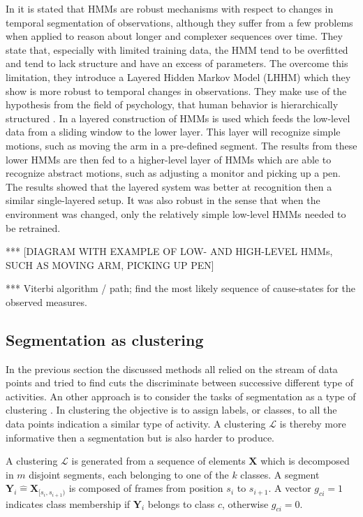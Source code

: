 In \cite{oliver2002layered} it is stated that HMMs are robust mechanisms with respect to changes in temporal segmentation of observations, although they suffer from a few problems when applied to reason about longer and complexer sequences over time.
They state that, especially with limited training data, the HMM tend to be overfitted and tend to lack structure and have an excess of parameters.
The overcome this limitation, they introduce a Layered Hidden Markov Model (LHHM) which they show is more robust to temporal changes in observations.
They make use of the hypothesis from the field of psychology, that human behavior is hierarchically structured \cite{zacks2001event}.
In \cite{perdikis2008recognition} a layered construction of HMMs is used which feeds the low-level data from a sliding window to the lower layer.
This layer will recognize simple motions, such as moving the arm in a pre-defined segment.
The results from these lower HMMs are then fed to a higher-level layer of HMMs which are able to recognize abstract motions, such as adjusting a monitor and picking up a pen.
The results showed that the layered system was better at recognition then a similar single-layered setup.
It was also robust in the sense that when the environment was changed, only the relatively simple low-level HMMs needed to be retrained.

*** [DIAGRAM WITH EXAMPLE OF LOW- AND HIGH-LEVEL HMMs, SUCH AS MOVING ARM, PICKING UP PEN]


*** Viterbi algorithm / path; find the most likely sequence of cause-states for the observed measures.





\subsection{Segmentation as clustering}
In the previous section the discussed methods all relied on the stream of data points and tried to find cuts the discriminate between successive different type of activities.
An other approach is to consider the tasks of segmentation as a type of clustering \cite{zhou2008aligned}.
In clustering the objective is to assign labels, or classes, to all the data points indication a similar type of activity.
A clustering $\mathcal{L}$ is thereby more informative then a segmentation but is also harder to produce.

A clustering $\mathcal{L}$ is generated from a sequence of elements $\mathbf{X}$ which is decomposed in $m$ disjoint segments, each belonging to one of the $k$ classes.
A segment $\mathbf{Y}_i \hat{=} \mathbf{X}_{[s_i,s_{i+1})}$ is composed of frames from position $s_i$ to $s_{i+1}$.
A vector $g_{ci} = 1$ indicates class membership if $\mathbf{Y}_i$ belongs to class $c$, otherwise $g_{ci} = 0$.

